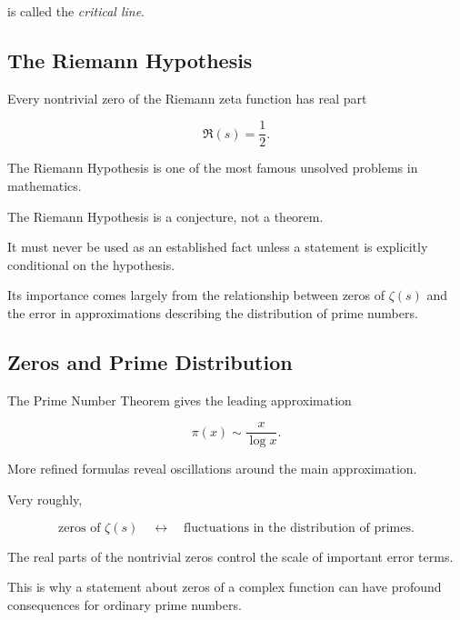 is called the \emph{critical line}.

\subsection{The Riemann Hypothesis}
\label{subsec:riemann-hypothesis}

\begin{conjecture}
Every nontrivial zero of the Riemann zeta function has real part

\[ \boxed{\Re(s)=\frac12.} \]
\end{conjecture}

The Riemann Hypothesis is one of the most famous unsolved problems in
mathematics.

\begin{importantbox}
The Riemann Hypothesis is a conjecture, not a theorem.

It must never be used as an established fact unless a statement is explicitly
conditional on the hypothesis.
\end{importantbox}

Its importance comes largely from the relationship between zeros of
\(\zeta(s)\) and the error in approximations describing the distribution of
prime numbers.

\subsection{Zeros and Prime Distribution}
\label{subsec:zeros-prime-distribution}

The Prime Number Theorem gives the leading approximation

\[ \pi(x)\sim\frac{x}{\log x}. \]

More refined formulas reveal oscillations around the main approximation.

Very roughly,

\[
\boxed{
\text{zeros of }\zeta(s)
\quad\longleftrightarrow\quad
\text{fluctuations in the distribution of primes}.
}
\]

The real parts of the nontrivial zeros control the scale of important error
terms.

This is why a statement about zeros of a complex function can have profound
consequences for ordinary prime numbers.

